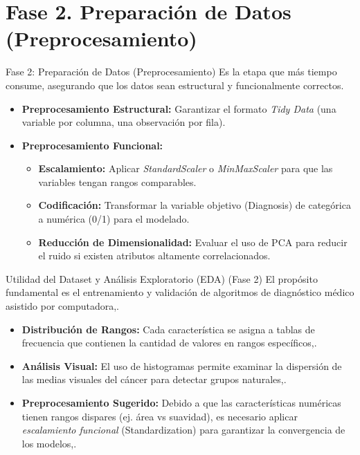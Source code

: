 \documentclass{beamer}
\begin{document}
	\section{Fase 2. Preparación de Datos (Preprocesamiento)}
	\begin{frame}{Fase 2: Preparación de Datos (Preprocesamiento)}
		Es la etapa que más tiempo consume, asegurando que los datos sean estructural y funcionalmente correctos.
		\begin{itemize}
			\item<2-> \textbf{Preprocesamiento Estructural:} Garantizar el formato \textit{Tidy Data} (una variable por columna, una observación por fila).
			\item<3-> \textbf{Preprocesamiento Funcional:}
			\begin{itemize}
				\item \textbf{Escalamiento:} Aplicar \textit{StandardScaler} o \textit{MinMaxScaler} para que las variables tengan rangos comparables.
				\item \textbf{Codificación:} Transformar la variable objetivo (Diagnosis) de categórica a numérica (0/1) para el modelado.
				\item \textbf{Reducción de Dimensionalidad:} Evaluar el uso de PCA para reducir el ruido si existen atributos altamente correlacionados.
			\end{itemize}
		\end{itemize}
	\end{frame}
			
	\begin{frame}{Utilidad del Dataset y Análisis Exploratorio (EDA) (Fase 2)}
		El propósito fundamental es el entrenamiento y validación de algoritmos de diagnóstico médico asistido por computadora,.
		\begin{itemize}
			\item<2-> \textbf{Distribución de Rangos:} Cada característica se asigna a tablas de frecuencia que contienen la cantidad de valores en rangos específicos,.
			\item<3-> \textbf{Análisis Visual:} El uso de histogramas permite examinar la dispersión de las medias visuales del cáncer para detectar grupos naturales,.
			\item<4-> \textbf{Preprocesamiento Sugerido:} Debido a que las características numéricas tienen rangos dispares (ej. área vs suavidad), es necesario aplicar \textit{escalamiento funcional} (Standardization) para garantizar la convergencia de los modelos,.
		\end{itemize}
	\end{frame}
	
\end{document}
